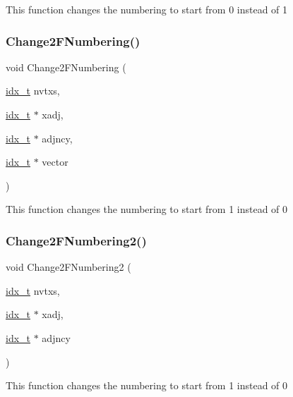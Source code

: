 This function changes the numbering to start from 0 instead of 1 \mbox{\label{a00200_a8acc37888a4e42ea0cbff2b900d69617}} 
\subsubsection{\texorpdfstring{Change2\+F\+Numbering()}{Change2FNumbering()}}
{\footnotesize\ttfamily void Change2\+F\+Numbering (\begin{DoxyParamCaption}\item[{\hyperlink{a00876_aaa5262be3e700770163401acb0150f52}{idx\+\_\+t}}]{nvtxs,  }\item[{\hyperlink{a00876_aaa5262be3e700770163401acb0150f52}{idx\+\_\+t} $\ast$}]{xadj,  }\item[{\hyperlink{a00876_aaa5262be3e700770163401acb0150f52}{idx\+\_\+t} $\ast$}]{adjncy,  }\item[{\hyperlink{a00876_aaa5262be3e700770163401acb0150f52}{idx\+\_\+t} $\ast$}]{vector }\end{DoxyParamCaption})}

This function changes the numbering to start from 1 instead of 0 \mbox{\label{a00200_a98a33de92ef1e76f819f5c9b7bdd4294}} 
\subsubsection{\texorpdfstring{Change2\+F\+Numbering2()}{Change2FNumbering2()}}
{\footnotesize\ttfamily void Change2\+F\+Numbering2 (\begin{DoxyParamCaption}\item[{\hyperlink{a00876_aaa5262be3e700770163401acb0150f52}{idx\+\_\+t}}]{nvtxs,  }\item[{\hyperlink{a00876_aaa5262be3e700770163401acb0150f52}{idx\+\_\+t} $\ast$}]{xadj,  }\item[{\hyperlink{a00876_aaa5262be3e700770163401acb0150f52}{idx\+\_\+t} $\ast$}]{adjncy }\end{DoxyParamCaption})}

This function changes the numbering to start from 1 instead of 0 \mbox{\label{a00200_a2702c825bdbbad60eba093760445070b}} 
